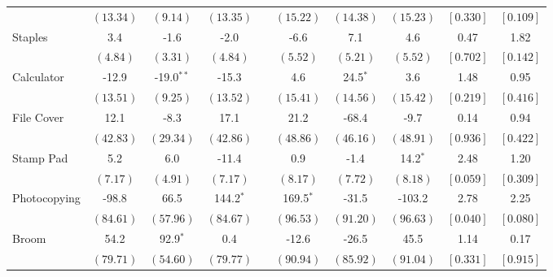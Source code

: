 \begin{tabular}{lccccccccc}
 & $ \left( 13.34\right) $  & $ \left(  9.14\right) $  & $ \left( 13.35\right) $ &  & $ \left( 15.22\right) $  & $ \left( 14.38\right) $  & $ \left( 15.23\right) $  & $ \left[ 0.330\right] $  & $ \left[ 0.109\right] $  \\ [0.25em] 
 \multirow{2}{*}{Staples}  &    3.4 &   -1.6 &   -2.0 &  &   -6.6 &    7.1 &    4.6 &   0.47 &   1.82 \\ 
 & $ \left(  4.84\right) $  & $ \left(  3.31\right) $  & $ \left(  4.84\right) $ &  & $ \left(  5.52\right) $  & $ \left(  5.21\right) $  & $ \left(  5.52\right) $  & $ \left[ 0.702\right] $  & $ \left[ 0.142\right] $  \\ [0.25em] 
 \multirow{2}{*}{Calculator}  &  -12.9 &  -19.0$^{**}$ &  -15.3 &  &    4.6 &   24.5$^{*}$ &    3.6 &   1.48 &   0.95 \\ 
 & $ \left( 13.51\right) $  & $ \left(  9.25\right) $  & $ \left( 13.52\right) $ &  & $ \left( 15.41\right) $  & $ \left( 14.56\right) $  & $ \left( 15.42\right) $  & $ \left[ 0.219\right] $  & $ \left[ 0.416\right] $  \\ [0.25em] 
 \multirow{2}{*}{File Cover}  &   12.1 &   -8.3 &   17.1 &  &   21.2 &  -68.4 &   -9.7 &   0.14 &   0.94 \\ 
 & $ \left( 42.83\right) $  & $ \left( 29.34\right) $  & $ \left( 42.86\right) $ &  & $ \left( 48.86\right) $  & $ \left( 46.16\right) $  & $ \left( 48.91\right) $  & $ \left[ 0.936\right] $  & $ \left[ 0.422\right] $  \\ [0.25em] 
 \multirow{2}{*}{Stamp Pad}  &    5.2 &    6.0 &  -11.4 &  &    0.9 &   -1.4 &   14.2$^{*}$ &   2.48 &   1.20 \\ 
 & $ \left(  7.17\right) $  & $ \left(  4.91\right) $  & $ \left(  7.17\right) $ &  & $ \left(  8.17\right) $  & $ \left(  7.72\right) $  & $ \left(  8.18\right) $  & $ \left[ 0.059\right] $  & $ \left[ 0.309\right] $  \\ [0.25em] 
 \multirow{2}{*}{Photocopying}  &  -98.8 &   66.5 &  144.2$^{*}$ &  &  169.5$^{*}$ &  -31.5 & -103.2 &   2.78 &   2.25 \\ 
 & $ \left( 84.61\right) $  & $ \left( 57.96\right) $  & $ \left( 84.67\right) $ &  & $ \left( 96.53\right) $  & $ \left( 91.20\right) $  & $ \left( 96.63\right) $  & $ \left[ 0.040\right] $  & $ \left[ 0.080\right] $  \\ [0.25em] 
 \multirow{2}{*}{Broom}  &   54.2 &   92.9$^{*}$ &    0.4 &  &  -12.6 &  -26.5 &   45.5 &   1.14 &   0.17 \\ 
 & $ \left( 79.71\right) $  & $ \left( 54.60\right) $  & $ \left( 79.77\right) $ &  & $ \left( 90.94\right) $  & $ \left( 85.92\right) $  & $ \left( 91.04\right) $  & $ \left[ 0.331\right] $  & $ \left[ 0.915\right] $  \\ [0.25em] 

\end{tabular}

